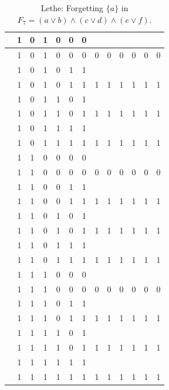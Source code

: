 \begin{table}[!tb]
\begin{tabular}{|c|c|c|c|c|c|c|c|c|c|c|c|c|}
        \rowcolor{gray!40}  & 1 & 0 & 1 & 0 & 0 & 0 &  &  &  &  &  &  \\ \hline
        \rowcolor{gray!40}  & 1 & 0 & 1 & 0 & 0 & 0 & 0 & 0 & 0 & 0 & 0 & 0 \\ \hline
        \rowcolor{blue!40}  & 1 & 0 & 1 & 0 & 1 & 1 &  &  &  &  &  &  \\ \hline
        \rowcolor{blue!40}  & 1 & 0 & 1 & 0 & 1 & 1 & 1 & 1 & 1 & 1 & 1 & 1 \\ \hline
        \rowcolor{red!40}  & 1 & 0 & 1 & 1 & 0 & 1 &  &  &  &  &  &  \\ \hline
        \rowcolor{red!40}  & 1 & 0 & 1 & 1 & 0 & 1 & 1 & 1 & 1 & 1 & 1 & 1 \\ \hline
        \rowcolor{green!40}  & 1 & 0 & 1 & 1 & 1 & 1 &  &  &  &  &  &  \\ \hline
        \rowcolor{green!40}  & 1 & 0 & 1 & 1 & 1 & 1 & 1 & 1 & 1 & 1 & 1 & 1 \\ \hline
        \rowcolor{yellow!40}  & 1 & 1 & 0 & 0 & 0 & 0 &  &  &  &  &  &  \\ \hline
        \rowcolor{yellow!40}  & 1 & 1 & 0 & 0 & 0 & 0 & 0 & 0 & 0 & 0 & 0 & 0 \\ \hline
        \rowcolor{gray!40}  & 1 & 1 & 0 & 0 & 1 & 1 &  &  &  &  &  &  \\ \hline
        \rowcolor{gray!40}  & 1 & 1 & 0 & 0 & 1 & 1 & 1 & 1 & 1 & 1 & 1 & 1 \\ \hline
        \rowcolor{blue!40}  & 1 & 1 & 0 & 1 & 0 & 1 &  &  &  &  &  &  \\ \hline
        \rowcolor{blue!40}  & 1 & 1 & 0 & 1 & 0 & 1 & 1 & 1 & 1 & 1 & 1 & 1 \\ \hline
        \rowcolor{red!40}  & 1 & 1 & 0 & 1 & 1 & 1 &  &  &  &  &  &  \\ \hline
        \rowcolor{red!40}  & 1 & 1 & 0 & 1 & 1 & 1 & 1 & 1 & 1 & 1 & 1 & 1 \\ \hline
        \rowcolor{green!40}  & 1 & 1 & 1 & 0 & 0 & 0 &  &  &  &  &  &  \\ \hline
        \rowcolor{green!40}  & 1 & 1 & 1 & 0 & 0 & 0 & 0 & 0 & 0 & 0 & 0 & 0 \\ \hline
        \rowcolor{yellow!40}  & 1 & 1 & 1 & 0 & 1 & 1 &  &  &  &  &  &  \\ \hline
        \rowcolor{yellow!40}  & 1 & 1 & 1 & 0 & 1 & 1 & 1 & 1 & 1 & 1 & 1 & 1 \\ \hline
        \rowcolor{gray!40}  & 1 & 1 & 1 & 1 & 0 & 1 &  &  &  &  &  &  \\ \hline
        \rowcolor{gray!40}  & 1 & 1 & 1 & 1 & 0 & 1 & 1 & 1 & 1 & 1 & 1 & 1 \\ \hline
        \rowcolor{blue!40}  & 1 & 1 & 1 & 1 & 1 & 1 &  &  &  &  &  &  \\ \hline
        \rowcolor{blue!40}  & 1 & 1 & 1 & 1 & 1 & 1 & 1 & 1 & 1 & 1 & 1 & 1 \\ \hline
    \end{tabular}
    \caption{Lethe: Forgetting $\{a\}$ in $F_{7} = (a \lor b) \land (c \lor d) \land (e \lor f)$.}
    \label{tab:lethe-F7-a}
\end{table}
